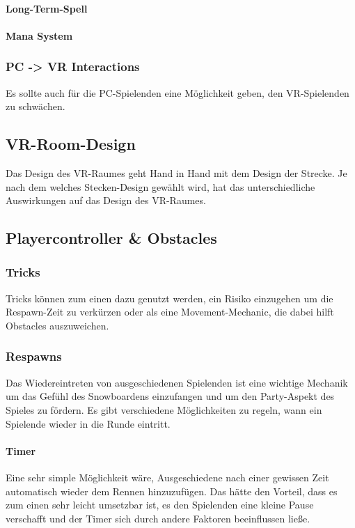 \paragraph{Long-Term-Spell}

\paragraph{Mana System}

\subsubsection{PC -> VR Interactions}

Es sollte auch für die PC-Spielenden eine Möglichkeit geben, den VR-Spielenden zu schwächen.

\subsection{VR-Room-Design}

Das Design des VR-Raumes geht Hand in Hand mit dem Design der Strecke. Je nach dem welches Stecken-Design gewählt wird, hat das unterschiedliche Auswirkungen auf das Design des VR-Raumes.

\subsection{Playercontroller \& Obstacles\label{_playercontroller}}
\subsubsection{Tricks}
Tricks können zum einen dazu genutzt werden, ein Risiko einzugehen um die Respawn-Zeit zu verkürzen oder als eine Movement-Mechanic, die dabei hilft Obstacles auszuweichen.

\subsubsection{Respawns}
Das Wiedereintreten von ausgeschiedenen Spielenden ist eine wichtige Mechanik um das Gefühl des Snowboardens einzufangen und um den Party-Aspekt des Spieles zu fördern. Es gibt verschiedene Möglichkeiten zu regeln, wann ein Spielende wieder in die Runde eintritt.

\paragraph{Timer}
Eine sehr simple Möglichkeit wäre, Ausgeschiedene nach einer gewissen Zeit automatisch wieder dem Rennen hinzuzufügen. Das hätte den Vorteil, dass es zum einen sehr leicht umsetzbar ist, es den Spielenden eine kleine Pause verschafft und der Timer sich durch andere Faktoren beeinflussen ließe.

